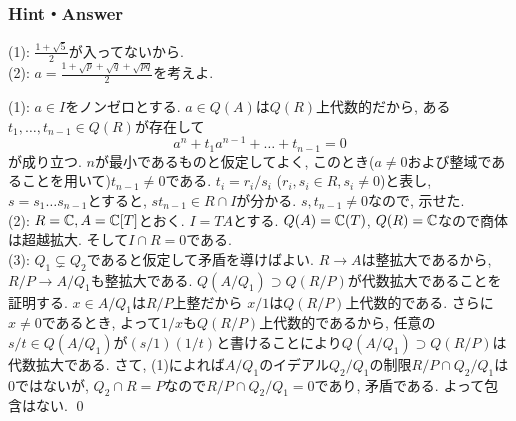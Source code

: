 \subsubsection{Hint・Answer}
{\small
\begin{probans}
(1): $\frac{1+\sqrt{5}}{2}$が入ってないから. \\
(2):  $a=\frac{1+\sqrt{p}+\sqrt{q}+\sqrt{pq}}{2}$を考えよ.
\end{probans}

\begin{probans}
(1): $a\in I$をノンゼロとする. $a\in Q(A)$は$Q(R)$上代数的だから, ある$t_1,\dots, t_{n-1}\in Q(R)$が存在して
\[a^n + t_{1}a^{n-1} + \dots + t_{n-1} = 0\]
が成り立つ. $n$が最小であるものと仮定してよく, このとき($a\neq 0$および整域であることを用いて)$t_{n-1}\neq 0$である. $t_i = r_i/s_i$ ($r_i,s_i\in R, s_i\neq 0$)と表し, $s=s_1\dots s_{n-1}$とすると, $st_{n-1} \in R \cap I$が分かる. $s,t_{n-1}\neq 0$なので, 示せた. \\
(2): $R=\mathbb{C}, A=\mathbb{C}[T]$とおく. $I=TA$とする. $Q(A) = \mathbb{C}(T)$, $Q(R) = \mathbb{C}$なので商体は超越拡大. そして$I\cap R=0$である. \\
(3): $Q_1\subsetneq Q_2$であると仮定して矛盾を導けばよい. $R\to A$は整拡大であるから, $R/P\to A/Q_1$も整拡大である. $Q(A/Q_1)\supset Q(R/P)$が代数拡大であることを証明する. $x\in A/Q_1$は$R/P$上整だから $x/1$は$Q(R/P)$上代数的である. さらに$x\neq 0$であるとき,  よって$1/x$も$Q(R/P)$上代数的であるから, 任意の$s/t\in Q(A/Q_1)$が$(s/1)(1/t)$と書けることにより$Q(A/Q_1)\supset Q(R/P)$は代数拡大である. さて, (1)によれば$A/Q_1$のイデアル$Q_2/Q_1$の制限$R/P \cap Q_2/Q_1$は0ではないが, $Q_2\cap R = P$なので$R/P \cap Q_2/Q_1 = 0$であり, 矛盾である. よって包含はない. \qed
\end{probans}

}
